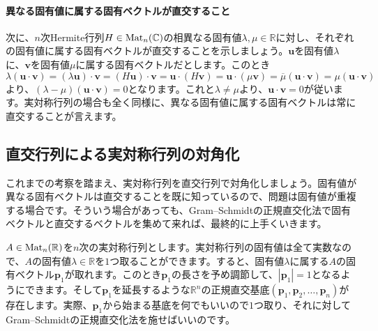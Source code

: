 \paragraph{異なる固有値に属する固有ベクトルが直交すること}

次に、$n$次Hermite行列$H \in \operatorname{Mat}_n(\mathbb{C})$の相異なる固有値$\lambda, \mu \in \mathbb{R}$に対し、それぞれの固有値に属する固有ベクトルが直交することを示しましょう。$\bm{u}$を固有値$\lambda$に、$\bm{v}$を固有値$\mu$に属する固有ベクトルだとします。このとき
\[
\lambda (\bm{u} \cdot \bm{v}) = (\lambda \bm{u}) \cdot \bm{v} = (H\bm{u}) \cdot \bm{v} = \bm{u} \cdot (H\bm{v}) = \bm{u} \cdot (\mu\bm{v}) = \overline{\mu} (\bm{u} \cdot \bm{v}) = \mu (\bm{u} \cdot \bm{v})
\]
より、$(\lambda - \mu)(\bm{u} \cdot \bm{v}) = 0$となります。これと$\lambda \neq \mu$より、$\bm{u} \cdot \bm{v} = 0$が従います。実対称行列の場合も全く同様に、異なる固有値に属する固有ベクトルは常に直交することが言えます。

\subsection{直交行列による実対称行列の対角化}

これまでの考察を踏まえ、実対称行列を直交行列で対角化しましょう。固有値が異なる固有ベクトルは直交することを既に知っているので、問題は固有値が重複する場合です。そういう場合があっても、Gram--Schmidtの正規直交化法で固有ベクトルと直交するベクトルを集めて来れば、最終的に上手くいきます。

$A \in \operatorname{Mat}_n(\mathbb{R})$を$n$次の実対称行列とします。実対称行列の固有値は全て実数なので、$A$の固有値$\lambda \in \mathbb{R}$を$1$つ取ることができます。すると、固有値$\lambda$に属する$A$の固有ベクトル$\bm{p}_1$が取れます。このとき$\bm{p}_1$の長さを予め調節して、$|\bm{p}_1| = 1$となるようにできます。そして$\bm{p}_1$を延長するような$\mathbb{R}^n$の正規直交基底$(\bm{p}_1, \bm{p}_2, \ldots, \bm{p}_n)$が存在します。実際、$\bm{p}_1$から始まる基底を何でもいいので$1$つ取り、それに対してGram--Schmidtの正規直交化法を施せばいいのです。

